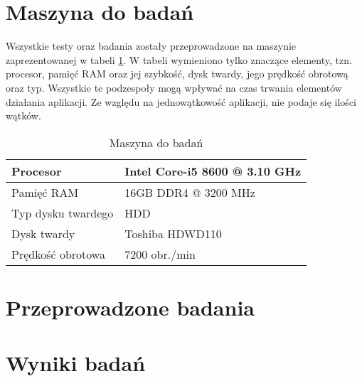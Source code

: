 \section{Maszyna do badań}
Wszystkie testy oraz badania zostały przeprowadzone na maszynie zaprezentowanej w tabeli \ref{tab:machine}. W tabeli wymieniono tylko znaczące elementy, tzn. procesor, pamięć RAM oraz jej szybkość, dysk twardy, jego prędkość obrotową oraz typ. Wszystkie te podzespoły mogą wpływać na czas trwania elementów działania aplikacji. Ze względu na jednowątkowość aplikacji, nie podaje się ilości wątków.
\begin{table}[H]
    \centering
    \begin{tabular}{|l|l|}
    \hline
    Procesor       & Intel Core-i5 8600 @ 3.10 GHz          \\ \hline
    Pamięć RAM     & 16GB DDR4 @ 3200 MHz \\ \hline
    Typ dysku twardego           & HDD              \\ \hline
    Dysk twardy         & Toshiba HDWD110              \\ \hline
    Prędkość obrotowa         & 7200 obr./min              \\ \hline
    \end{tabular}
    \caption{Maszyna do badań}
    \label{tab:machine}
\end{table}
\section{Przeprowadzone badania}
\section{Wyniki badań}